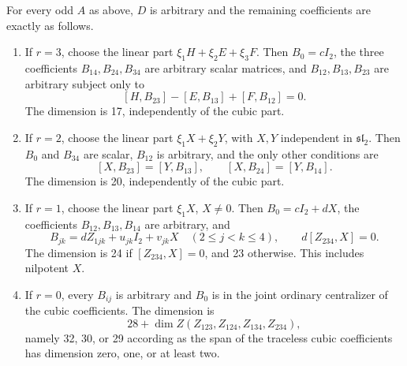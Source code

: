 \begin{theorem}[All even commutants for \(n=2,N=4\) \ours]
For every odd \(A\) as above, \(D\) is arbitrary and the remaining coefficients are exactly as follows.
\begin{enumerate}[label=(\roman*)]
\item If \(r=3\), choose the linear part \(\xi_1H+\xi_2E+\xi_3F\). Then \(B_0=cI_2\), the three coefficients \(B_{14},B_{24},B_{34}\) are arbitrary scalar matrices, and \(B_{12},B_{13},B_{23}\) are arbitrary subject only to
\[
 [H,B_{23}]-[E,B_{13}]+[F,B_{12}]=0.
\]
The dimension is 17, independently of the cubic part.
\item If \(r=2\), choose the linear part \(\xi_1X+\xi_2Y\), with \(X,Y\) independent in \(\mathfrak{sl}_2\). Then \(B_0\) and \(B_{34}\) are scalar, \(B_{12}\) is arbitrary, and the only other conditions are
\[
 [X,B_{23}]=[Y,B_{13}],\qquad [X,B_{24}]=[Y,B_{14}].
\]
The dimension is 20, independently of the cubic part.
\item If \(r=1\), choose the linear part \(\xi_1X\), \(X\ne0\). Then \(B_0=cI_2+dX\), the coefficients \(B_{12},B_{13},B_{14}\) are arbitrary, and
\[
 B_{jk}=dZ_{1jk}+u_{jk}I_2+v_{jk}X\quad(2\leq j<k\leq4),
 \qquad d[Z_{234},X]=0.
\]
The dimension is 24 if \([Z_{234},X]=0\), and 23 otherwise. This includes nilpotent \(X\).
\item If \(r=0\), every \(B_{ij}\) is arbitrary and \(B_0\) is in the joint ordinary centralizer of the cubic coefficients. The dimension is
\[
 28+\dim Z(Z_{123},Z_{124},Z_{134},Z_{234}),
\]
namely 32, 30, or 29 according as the span of the traceless cubic coefficients has dimension zero, one, or at least two.
\end{enumerate}
\end{theorem}

